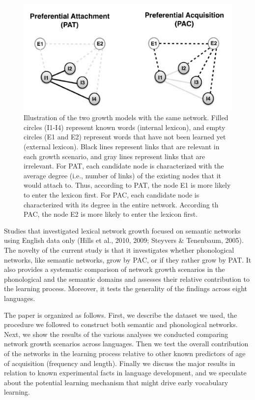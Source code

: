 \documentclass[10pt, letterpaper]{article}
\newenvironment{CodeChunk}{}{}
\begin{document}
\begin{CodeChunk}
\begin{figure}[H]

{\centering \includegraphics{figs/growth-1} 

}

\caption{\label{fig:growth}Illustration of the two growth models with the same network. Filled circles (I1-I4) represent known words (internal lexicon), and empty circles (E1 and E2) represent words that have not been learned yet (external lexicon). Black lines represent links that are relevant in each growth scenario, and gray lines represent links that are irrelevant. For PAT, each candidate node is characterized with the average degree (i.e., number of links) of the existing nodes that it would attach to. Thus, according to PAT, the node E1 is more likely to enter the lexicon first. For PAC, each candidate node is characterized with its degree in the entire network. According th PAC, the node E2 is more likely to enter the lexicon first.}\label{fig:growth}
\end{figure}
\end{CodeChunk}

Studies that investigated lexical network growth focused on semantic
networks using English data only (Hills et al., 2010, 2009; Steyvers \&
Tenenbaum, 2005). The novelty of the current study is that it
investigates whether phonological networks, like semantic networks, grow
by PAC, or if they rather grow by PAT. It also provides a systematic
comparison of network growth scenarios in the phonological and the
semantic domains and assesses their relative contribution to the
learning process. Moreover, it tests the generality of the findings
across eight languages.

The paper is organized as follows. First, we describe the dataset we
used, the procedure we followed to construct both semantic and
phonological networks. Next, we show the results of the various analyses
we conducted comparing network growth scenarios across languages. Then
we test the overall contribution of the networks in the learning process
relative to other known predictors of age of acquisition (frequency and
length). Finally we discuss the major results in relation to known
experimental facts in language development, and we speculate about the
potential learning mechanism that might drive early vocabulary learning.
\end{document}
